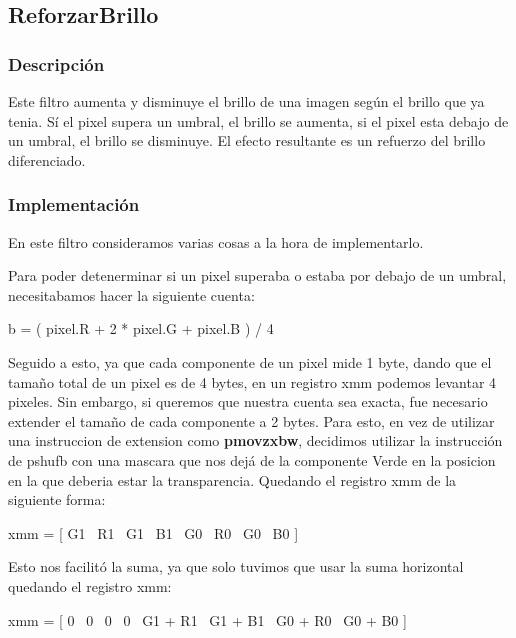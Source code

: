 \documentclass[a4paper]{article}
\begin{document}
\subsection{ReforzarBrillo}

\subsubsection{Descripción}

Este filtro aumenta y disminuye el brillo de una imagen según el brillo que ya tenia. Sí el
pixel supera un umbral, el brillo se aumenta, si el pixel esta debajo de un umbral, el brillo se
disminuye. El efecto resultante es un refuerzo del brillo diferenciado.

\subsubsection{Implementaci\'on}

En este filtro consideramos varias cosas a la hora de implementarlo.

Para poder detenerminar si un pixel superaba o estaba por debajo de un umbral, necesitabamos hacer la siguiente cuenta:

\begin{center}
	b = ( pixel.R + 2 * pixel.G + pixel.B ) / 4
\end{center}

Seguido a esto, ya que cada componente de un pixel mide 1 byte, dando que el tama\~no total de un pixel es de 4 bytes, en un registro xmm podemos levantar 4 pixeles. Sin embargo, si queremos que nuestra cuenta sea exacta, fue necesario extender el tama\~no de cada componente a 2 bytes. Para esto, en vez de utilizar una instruccion de extension como \textbf{pmovzxbw}, decidimos utilizar la instrucción de pshufb con una mascara que nos dejá de la componente Verde en la posicion en la que deberia estar la transparencia. Quedando el registro xmm de la siguiente forma: 

\begin{center}
	xmm = [ G1 \textpipe\ R1 \textpipe\ G1 \textpipe\ B1 \textpipe\ G0 \textpipe\ R0 \textpipe\ G0 \textpipe\ B0 ]
\end{center}

Esto nos facilit\'o la suma, ya que solo tuvimos que usar la suma horizontal quedando el registro xmm:

\begin{center}
	xmm = [ 0 \textpipe\ 0 \textpipe\ 0 \textpipe\ 0 \textpipe\ G1 + R1 \textpipe\ G1 + B1 \textpipe\ G0 + R0 \textpipe\ G0 + B0 ]
\end{center}
\end{document}
